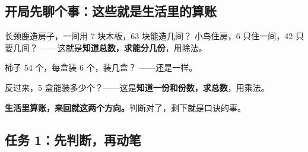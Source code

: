 \subsection{开局先聊个事：这些就是生活里的算账}

长颈鹿造房子，一间用 7 块木板，63 块能造几间？
小鸟住房，6 只住一间，42 只要几间？
——这就是\textbf{知道总数，求能分几份}，用除法。

柿子 54 个，每盒装 6 个，装几盒？
——还是一样。

反过来，5 盒能装多少个？——这是\textbf{知道一份和份数，求总数}，用乘法。

\textbf{生活里算账，来回就这两个方向。}判断对了，剩下就是口诀的事。

\subsection{任务 1：先判断，再动笔}

